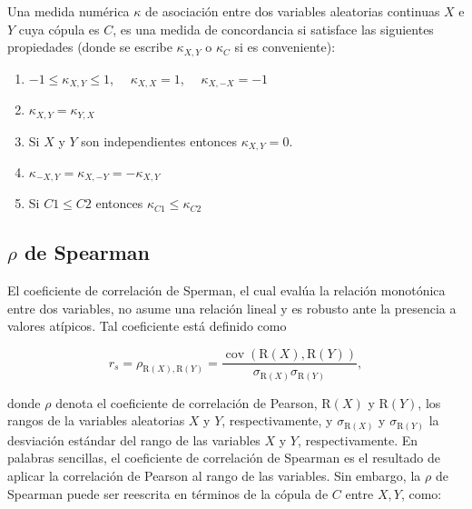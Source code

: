 \begin{defn}
    Una medida numérica $\kappa$ de asociación entre dos variables aleatorias continuas $X$ e $Y$ cuya cópula es $C$, es una medida de concordancia si satisface las siguientes propiedades (donde se escribe $\kappa_{X,Y}$ o $\kappa_{C}$ si es conveniente):

    \begin{enumerate}
        \item $-1 \leq \kappa_{X,Y} \leq 1$, $\quad \kappa_{X,X} = 1$, $\quad \kappa_{X,-X} = -1$

        \item $\kappa_{X,Y} = \kappa_{Y,X}$

        \item Si $X$ y $Y$ son independientes entonces $\kappa_{X,Y} = 0$.

        \item $\kappa_{-X,Y} = \kappa_{X,-Y} = -\kappa_{X,Y}$
        \item Si $C1 \leq C2$ entonces $\kappa_{C1} \leq \kappa_{C2}$
    \end{enumerate}
\end{defn}
\subsection{$\rho$ de Spearman}

El coeficiente de correlación de Sperman, el cual evalúa la relación monotónica entre dos variables, no asume una relación lineal y es robusto ante la presencia a valores atípicos. Tal coeficiente está definido como

\begin{equation}\label{corSpear}
    r_s=\rho_{\mathrm{R}(X), \mathrm{R}(Y)}=\frac{\operatorname{cov}(\mathrm{R}(X), \mathrm{R}(Y))}{\sigma_{\mathrm{R}(X)} \sigma_{\mathrm{R}(Y)}},
\end{equation}

donde $\rho$ denota el coeficiente de correlación de Pearson, $\mathrm{R}(X)$ y $\mathrm{R}(Y)$, los rangos de la variables aleatorias $X$ y $Y$, respectivamente, y $\sigma_{\mathrm{R}(X)}$ y $\sigma_{\mathrm{R}(Y)}$ la desviación estándar del rango de las variables $X$ y $Y$, respectivamente. En palabras sencillas, el coeficiente de correlación de Spearman es el resultado de aplicar la correlación de Pearson al rango de las variables. Sin embargo, la $\rho$ de Spearman puede ser reescrita en términos de la cópula de $C$ entre $X, Y$, como:

